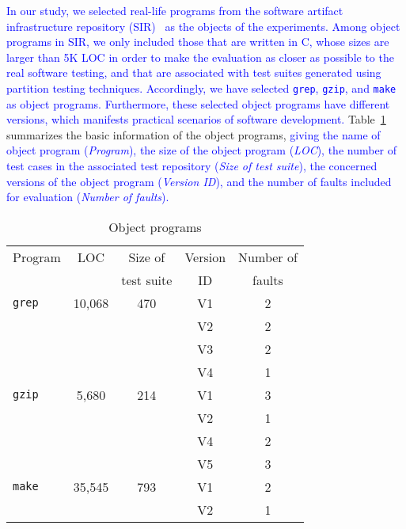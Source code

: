 \documentclass[10pt,journal,compsoc]{IEEEtran}
\begin{document}
\textcolor{blue}{In our study, we selected real-life programs from the software artifact infrastructure repository (SIR)~\cite{Do05} as the objects of the experiments. Among object programs in SIR, we only included those that are written in C, whose sizes are larger than 5K LOC in order to make the evaluation as closer as possible to the real software testing, and that are associated with test suites generated using partition testing techniques. Accordingly, we have selected \texttt{grep}, \texttt{gzip}, and \texttt{make} as object programs. Furthermore, these selected object programs have different versions, which manifests practical scenarios of software development.} Table~\ref{tab:objects} summarizes the basic information of the object programs, \textcolor{blue}{giving the name of object program (\emph{Program}), the size of the object program (\emph{LOC}), the number of test cases in the associated test repository (\emph{Size of test suite}), the concerned versions of the object program (\emph{Version ID}), and the number of faults included for evaluation (\emph{Number of faults}).}

\begin{table}
\caption{Object programs}
\label{tab:objects}
\centering
\begin{tabular}{|l|c|c|c|c|} \hline
Program				& LOC			& Size of			& Version	& Number of	\\
        			&					& test suite	& ID			& faults		\\ \hline
\texttt{grep}	    & 10,068	        & 470					& V1			& 2					\\ \cline{4-5}
        			&					& 						& V2			& 2					\\ \cline{4-5}
        			&					& 						& V3			& 2					\\ \cline{4-5}
        			&					& 						& V4			& 1					\\ \hline
\texttt{gzip}	    & 5,680		        & 214					& V1			& 3					\\ \cline{4-5}
        			&					& 						& V2			& 1					\\ \cline{4-5}
        			&					& 						& V4			& 2					\\ \cline{4-5}
        			&					& 						& V5			& 3					\\ \hline
\texttt{make}	    & 35,545	        & 793					& V1			& 2					\\ \cline{4-5}
        			&					& 						& V2			& 1					\\ \hline
\end{tabular}
\end{table}
\end{document}
